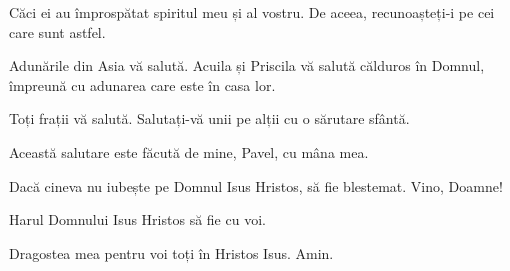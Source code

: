 {Căci ei au împrospătat spiritul meu și al vostru. De aceea, recunoașteți-i pe cei care sunt astfel.


\par }{\PP {}Adunările din Asia vă salută. Acuila și Priscila vă salută călduros în Domnul, împreună cu adunarea care este în casa lor.

Toți frații vă salută. Salutați-vă unii pe alții cu o sărutare sfântă.


\par }{\PP {}Această salutare este făcută de mine, Pavel, cu mâna mea.

Dacă cineva nu iubește pe Domnul Isus Hristos, să fie blestemat. Vino, Doamne!

Harul Domnului Isus Hristos să fie cu voi.

Dragostea mea pentru voi toți în Hristos Isus. Amin.


\par }